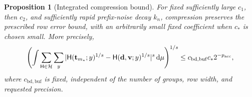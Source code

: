 \documentclass[11pt]{article}
\numberwithin{equation}{section}
\newtheorem{proposition}[theorem]{Proposition}
\theoremstyle{definition}
\theoremstyle{remark}
\begin{document}
\begin{proposition}[Integrated compression bound]
\label{prop:buf-error}
For fixed sufficiently large $c_1$, then $c_2$, and sufficiently rapid
prefix-noise decay ${k}_n$, compression preserves the prescribed row error
bound, with an arbitrarily small fixed coefficient when $c_*$ is chosen
small.  More precisely,
\begin{equation}
 \left(\int\sum_{{\mathsf{H}}\in\mathcal H}\sum_y
  |{\mathsf{H}}({\mathbf{t}}_{m_*};y)^{1/s}-{\mathsf{H}}({\mathbf{d}},{\mathbf{v}};y)^{1/s}|^s\,\mathrm d\mu\right)^{1/s}
       \leq {c_{\mathrm{bd},\mathrm{buf}}}c_*2^{-{p_{\rm acc}}},
 \label{eq:buf-integrated}
\end{equation}
where ${c_{\mathrm{bd},\mathrm{buf}}}$ is fixed, independent of the number of groups,
row width, and requested precision.
\end{proposition}
\end{document}

